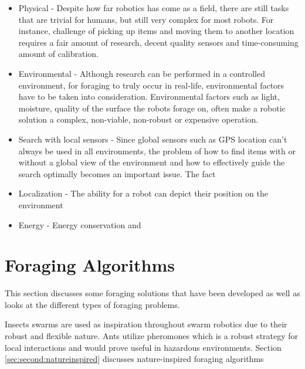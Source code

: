 \begin{itemize}
\item Physical - Despite how far robotics has come as a field, there are still tasks that are trivial for humans, but still very complex for most robots. For instance, challenge of picking up items and moving them to another location requires a fair amount of research, decent quality sensors and time-consuming amount of calibration. 
\item Environmental - Although research can be performed in a controlled environment, for foraging to truly occur in real-life, environmental factors have to be taken into consideration. Environmental factors such as light, moisture, quality of the surface the robots forage on, often make a robotic solution a complex, non-viable, non-robust or expensive operation. 
\item Search with local sensors - Since global sensors such as GPS location can't always be used in all environments, the problem of how to find items with or without a global view of the environment and how to effectively guide the search optimally becomes an important issue. The fact 
\item Localization - The ability for a robot can depict their position on the environment
\item Energy - Energy conservation and   
\end{itemize}

\section{Foraging Algorithms}
\label{sec:second:existingsolution}


This section discusses some foraging solutions that have been developed as well as looks at the different types of foraging problems. 

Insects swarms are used as inspiration throughout swarm robotics due to their robust and flexible nature. Ants utilize pheromones which is a robust strategy for local interactions and would prove useful in hazardous environments. Section \ref{sec:second:natureinspired} discusses nature-inspired foraging algorithms 
 
